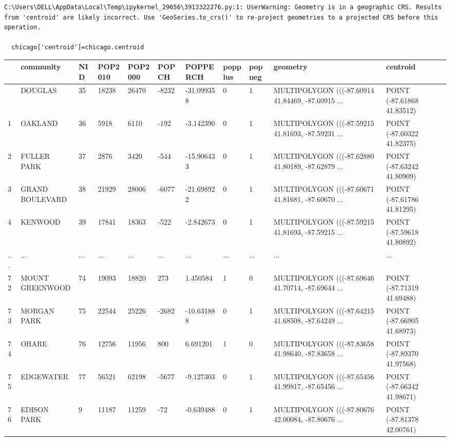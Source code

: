 \documentclass[
  letterpaper,
  DIV=11,
  numbers=noendperiod]{scrreprt}
\begin{document}
\begin{verbatim}
C:\Users\DELL\AppData\Local\Temp\ipykernel_29656\3913322276.py:1: UserWarning: Geometry is in a geographic CRS. Results from 'centroid' are likely incorrect. Use 'GeoSeries.to_crs()' to re-project geometries to a projected CRS before this operation.

  chicago['centroid']=chicago.centroid
\end{verbatim}

\begin{longtable}[]{@{}lllllllllll@{}}
\toprule\noalign{}
& community & NID & POP2010 & POP2000 & POPCH & POPPERCH & popplus &
popneg & geometry & centroid \\
\midrule\noalign{}
\endhead
\bottomrule\noalign{}
\endlastfoot
0 & DOUGLAS & 35 & 18238 & 26470 & -8232 & -31.099358 & 0 & 1 &
MULTIPOLYGON (((-87.60914 41.84469, -87.60915 ... & POINT (-87.61868
41.83512) \\
1 & OAKLAND & 36 & 5918 & 6110 & -192 & -3.142390 & 0 & 1 & MULTIPOLYGON
(((-87.59215 41.81693, -87.59231 ... & POINT (-87.60322 41.82375) \\
2 & FULLER PARK & 37 & 2876 & 3420 & -544 & -15.906433 & 0 & 1 &
MULTIPOLYGON (((-87.62880 41.80189, -87.62879 ... & POINT (-87.63242
41.80909) \\
3 & GRAND BOULEVARD & 38 & 21929 & 28006 & -6077 & -21.698922 & 0 & 1 &
MULTIPOLYGON (((-87.60671 41.81681, -87.60670 ... & POINT (-87.61786
41.81295) \\
4 & KENWOOD & 39 & 17841 & 18363 & -522 & -2.842673 & 0 & 1 &
MULTIPOLYGON (((-87.59215 41.81693, -87.59215 ... & POINT (-87.59618
41.80892) \\
... & ... & ... & ... & ... & ... & ... & ... & ... & ... & ... \\
72 & MOUNT GREENWOOD & 74 & 19093 & 18820 & 273 & 1.450584 & 1 & 0 &
MULTIPOLYGON (((-87.69646 41.70714, -87.69644 ... & POINT (-87.71319
41.69488) \\
73 & MORGAN PARK & 75 & 22544 & 25226 & -2682 & -10.631888 & 0 & 1 &
MULTIPOLYGON (((-87.64215 41.68508, -87.64249 ... & POINT (-87.66905
41.68973) \\
74 & OHARE & 76 & 12756 & 11956 & 800 & 6.691201 & 1 & 0 & MULTIPOLYGON
(((-87.83658 41.98640, -87.83658 ... & POINT (-87.89370 41.97568) \\
75 & EDGEWATER & 77 & 56521 & 62198 & -5677 & -9.127303 & 0 & 1 &
MULTIPOLYGON (((-87.65456 41.99817, -87.65456 ... & POINT (-87.66342
41.98671) \\
76 & EDISON PARK & 9 & 11187 & 11259 & -72 & -0.639488 & 0 & 1 &
MULTIPOLYGON (((-87.80676 42.00084, -87.80676 ... & POINT (-87.81378
42.00761) \\
\end{longtable}
\end{document}
